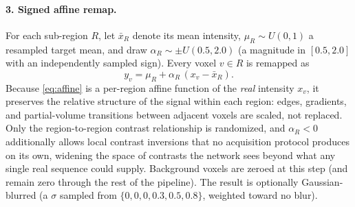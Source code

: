 \paragraph{3. Signed affine remap.} For each sub-region $R$, let $\bar{x}_R$
denote its mean intensity, $\mu_R \sim U(0,1)$ a resampled target mean, and
draw $\alpha_R \sim \pm U(0.5, 2.0)$ (a magnitude in $[0.5, 2.0]$ with an
independently sampled sign). Every voxel $v \in R$ is remapped as
\begin{equation}
  y_v = \mu_R + \alpha_R \, (x_v - \bar{x}_R).
  \label{eq:affine}
\end{equation}
Because \cref{eq:affine} is a per-region affine function of the
\emph{real} intensity $x_v$, it preserves the relative structure of the
signal within each region: edges, gradients, and partial-volume transitions
between adjacent voxels are scaled, not replaced. Only the region-to-region
contrast relationship is randomized, and $\alpha_R < 0$ additionally allows
local contrast inversions that no acquisition protocol produces on its own,
widening the space of contrasts the network sees beyond what any single
real sequence could supply. Background voxels are zeroed at this step (and
remain zero through the rest of the pipeline). The result is optionally
Gaussian-blurred (a $\sigma$ sampled from $\{0,0,0,0.3,0.5,0.8\}$, weighted
toward no blur).

